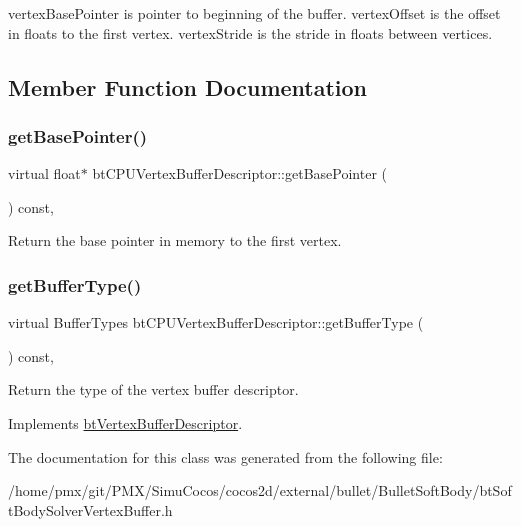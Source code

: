 vertex\+Base\+Pointer is pointer to beginning of the buffer. vertex\+Offset is the offset in floats to the first vertex. vertex\+Stride is the stride in floats between vertices. 

\subsection{Member Function Documentation}
\mbox{\label{classbtCPUVertexBufferDescriptor_a491e17ba85f6efc4433595b75c0ba928}} 
\subsubsection{\texorpdfstring{get\+Base\+Pointer()}{getBasePointer()}}
{\footnotesize\ttfamily virtual float$\ast$ bt\+C\+P\+U\+Vertex\+Buffer\+Descriptor\+::get\+Base\+Pointer (\begin{DoxyParamCaption}{ }\end{DoxyParamCaption}) const\hspace{0.3cm}{\ttfamily [inline]}, {\ttfamily [virtual]}}

Return the base pointer in memory to the first vertex. \mbox{\label{classbtCPUVertexBufferDescriptor_ab0ade8a42a69f574e48abb88b7e5350e}} 
\subsubsection{\texorpdfstring{get\+Buffer\+Type()}{getBufferType()}}
{\footnotesize\ttfamily virtual Buffer\+Types bt\+C\+P\+U\+Vertex\+Buffer\+Descriptor\+::get\+Buffer\+Type (\begin{DoxyParamCaption}{ }\end{DoxyParamCaption}) const\hspace{0.3cm}{\ttfamily [inline]}, {\ttfamily [virtual]}}

Return the type of the vertex buffer descriptor. 

Implements \hyperlink{classbtVertexBufferDescriptor_a1744d7c3b3452f130a215927d63ab130}{bt\+Vertex\+Buffer\+Descriptor}.



The documentation for this class was generated from the following file\+:\begin{DoxyCompactItemize}
\item 
/home/pmx/git/\+P\+M\+X/\+Simu\+Cocos/cocos2d/external/bullet/\+Bullet\+Soft\+Body/bt\+Soft\+Body\+Solver\+Vertex\+Buffer.\+h\end{DoxyCompactItemize}
